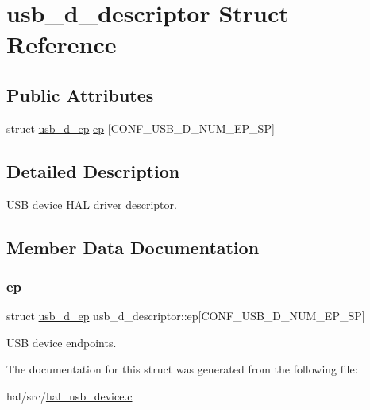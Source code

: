 \hypertarget{structusb__d__descriptor}{}\section{usb\+\_\+d\+\_\+descriptor Struct Reference}
\label{structusb__d__descriptor}
\subsection*{Public Attributes}
\begin{DoxyCompactItemize}
\item 
struct \hyperlink{structusb__d__ep}{usb\+\_\+d\+\_\+ep} \hyperlink{structusb__d__descriptor_a5aac8ab8b72a2f939465467c5cf5d6c4}{ep} \mbox{[}C\+O\+N\+F\+\_\+\+U\+S\+B\+\_\+\+D\+\_\+\+N\+U\+M\+\_\+\+E\+P\+\_\+\+SP\mbox{]}
\end{DoxyCompactItemize}


\subsection{Detailed Description}
U\+SB device H\+AL driver descriptor. 

\subsection{Member Data Documentation}
\mbox{\label{structusb__d__descriptor_a5aac8ab8b72a2f939465467c5cf5d6c4}} 
\subsubsection{\texorpdfstring{ep}{ep}}
{\footnotesize\ttfamily struct \hyperlink{structusb__d__ep}{usb\+\_\+d\+\_\+ep} usb\+\_\+d\+\_\+descriptor\+::ep\mbox{[}C\+O\+N\+F\+\_\+\+U\+S\+B\+\_\+\+D\+\_\+\+N\+U\+M\+\_\+\+E\+P\+\_\+\+SP\mbox{]}}

U\+SB device endpoints. 

The documentation for this struct was generated from the following file\+:\begin{DoxyCompactItemize}
\item 
hal/src/\hyperlink{hal__usb__device_8c}{hal\+\_\+usb\+\_\+device.\+c}\end{DoxyCompactItemize}
